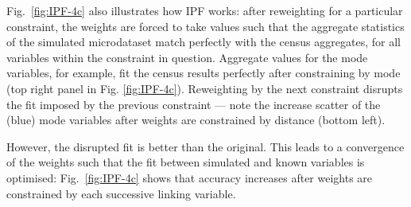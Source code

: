 Fig.~\ref{fig:IPF-4c} also illustrates how IPF works: after reweighting for
a particular constraint, the weights are forced to take values such that the
aggregate statistics of the simulated microdataset match perfectly with the
census aggregates, for all variables within the constraint in question.
Aggregate values for the mode variables, for example, fit the census results
perfectly after constraining by mode (top right panel in Fig.
\ref{fig:IPF-4c}). Reweighting by the next constraint disrupts the fit
imposed by the previous constraint --- note the increase scatter of the (blue)
mode variables after weights are constrained by distance (bottom left).

However, the disrupted fit is better than the original. This leads to
a convergence of the weights such that the fit between simulated and known
variables is optimised:
Fig.~\ref{fig:IPF-4c} shows that accuracy increases after weights are
constrained by each successive linking variable.
%

